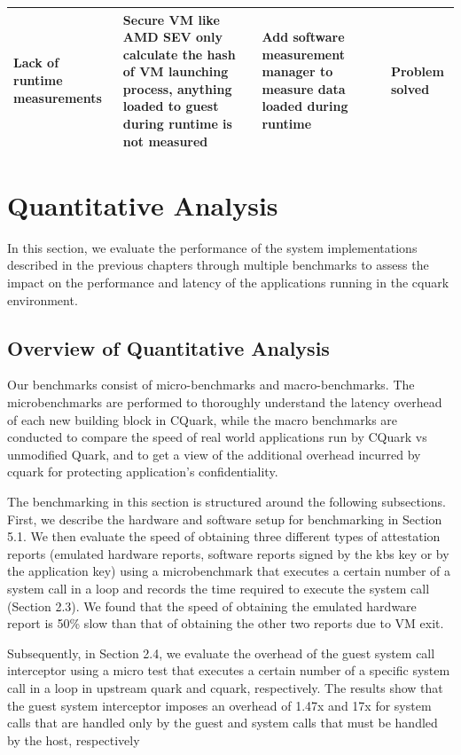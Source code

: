 \begin{table}[H]
\begin{tabular}{  p{3.4cm}  p{3.4cm}  p{3.4cm} p{2cm} }
Lack of runtime measurements
& Secure VM like AMD SEV only calculate the hash of VM launching process, anything loaded to guest during runtime is not measured
& Add software measurement manager to measure data loaded during runtime
& Problem solved  \\\hline
        \bottomrule
    \end{tabular}
\end{table}


\section{Quantitative Analysis}
In this section, we evaluate the performance of the system implementations described in the previous chapters through multiple benchmarks to assess the impact on the performance and latency of the applications running in the cquark environment.


\subsection{Overview of Quantitative Analysis}


Our benchmarks  consist of micro-benchmarks and macro-benchmarks. The microbenchmarks are performed to  thoroughly understand the latency overhead of each new building block in CQuark, while the macro benchmarks are conducted to compare the speed of 
real world applications run by CQuark vs unmodified Quark, and to get a view of the additional overhead incurred by cquark for protecting application’s confidentiality.


The benchmarking in this section is structured around the following subsections. First, we describe the hardware and software setup for benchmarking in Section 5.1. We then evaluate the speed of obtaining three different types of attestation reports (emulated hardware reports, software reports signed 
by the kbs key or by the application key) using a microbenchmark that executes a certain number of a system call in a loop and records the time required to execute the system call (Section 2.3). We found that the speed of obtaining the emulated hardware report is 50\% slow than that of obtaining the other two reports due to VM exit. 

Subsequently, in Section 2.4, we evaluate the overhead of the guest system call interceptor using a micro test that executes a certain number of a specific system call in a loop in upstream quark and cquark, respectively. The results show that the guest system interceptor imposes an overhead of 1.47x 
and 17x for system calls that are handled only by the guest and system calls that must be handled by the host, respectively


